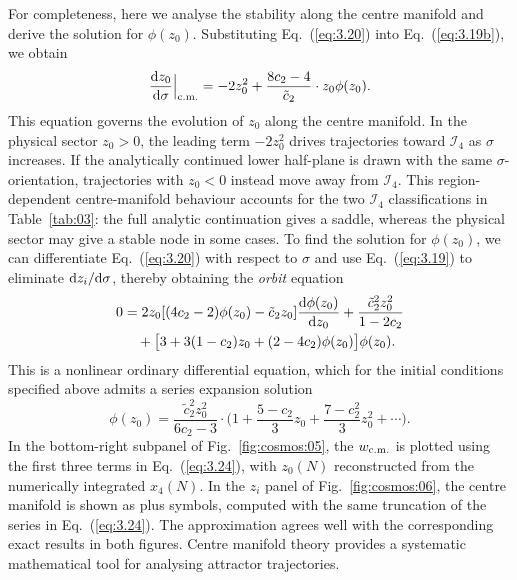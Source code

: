 \documentclass[aps,prd,twocolumn]{revtex4-2}
\newcommand\dx{{\rm d}}
\newcommand\subcm{{\rm c.m.}}
\begin{document}
For completeness, here we analyse the stability along the centre manifold and derive the solution for $\phi(z_0)$. Substituting Eq.~(\ref{eq:3.20}) into Eq.~(\ref{eq:3.19b}), we obtain
\begin{equation}
  \frac{\dx z_0}{\dx\sigma}\Big|_\subcm = -2z_0^2 + \frac{8c_2-4}{\tilde{c}_2}\cdot z_0\phi(z_0).
\end{equation}
This equation governs the evolution of $z_0$ along the centre manifold. In the physical sector $z_0>0$, the leading term $-2z_0^2$ drives trajectories toward $\mathcal{I}_4$ as $\sigma$ increases. If the analytically continued lower half-plane is drawn with the same $\sigma$-orientation, trajectories with $z_0<0$ instead move away from $\mathcal{I}_4$. This region-dependent centre-manifold behaviour accounts for the two $\mathcal{I}_4$ classifications in Table~\ref{tab:03}: the full analytic continuation gives a saddle, whereas the physical sector may give a stable node in some cases. To find the solution for $\phi(z_0)$, we can differentiate Eq.~(\ref{eq:3.20}) with respect to $\sigma$ and use Eq.~(\ref{eq:3.19}) to eliminate $\dx z_i/\dx\sigma$, thereby obtaining the \textit{orbit} equation
\begin{align}\label{eq:3.23}
  0 &= 2 z_0 [(4c_2-2)\phi(z_0) - \tilde{c}_2z_0] \frac{\dx \phi(z_0)}{\dx z_0} + \frac{\tilde{c}_2^2 z_0^2}{1-2c_2} \nonumber\\
  &\quad + \big[3 + 3(1-c_2)z_0 + (2-4c_2)\phi(z_0)\big] \phi(z_0).
\end{align}
This is a nonlinear ordinary differential equation, which for the initial conditions specified above admits a series expansion solution
\begin{equation}\label{eq:3.24}
  \phi(z_0) = \frac{\tilde{c}_2^2z_0^2}{6c_2-3} \cdot \Big(1 + \frac{5-c_2}{3}z_0 + \frac{7-c_2^2}{3}z_0^2 + \cdots\Big).
\end{equation}
In the bottom-right subpanel of Fig.~\ref{fig:cosmos:05}, the $w_\subcm$ is plotted using the first three terms in Eq.~(\ref{eq:3.24}), with $z_0(N)$ reconstructed from the numerically integrated $x_4(N)$. In the $z_i$ panel of Fig.~\ref{fig:cosmos:06}, the centre manifold is shown as plus symbols, computed with the same truncation of the series in Eq.~(\ref{eq:3.24}). The approximation agrees well with the corresponding exact results in both figures. Centre manifold theory provides a systematic mathematical tool for analysing attractor trajectories.
\end{document}
